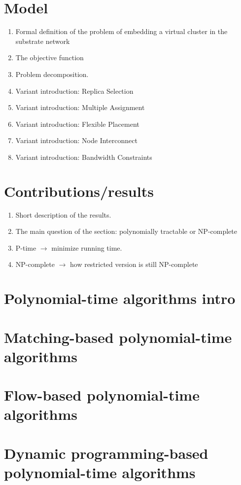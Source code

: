 \documentclass[a4paper]{book}
\begin{document}
\section{Model}
\begin{enumerate}
  \item Formal definition of the problem of embedding a virtual cluster in the substrate network
  \item The objective function
  \item Problem decomposition.
  \item Variant introduction: Replica Selection
  \item Variant introduction: Multiple Assignment
  \item Variant introduction: Flexible Placement
  \item Variant introduction: Node Interconnect
  \item Variant introduction: Bandwidth Constraints
\end{enumerate}
\section{Contributions/results}
\begin{enumerate}
  \item Short description of the results.
  \item The main question of the section: polynomially tractable or NP-complete
  \item P-time $\rightarrow$ minimize running time.
  \item NP-complete $\rightarrow$ how restricted version is still NP-complete
\end{enumerate}

\section{Polynomial-time algorithms intro}
\section{Matching-based polynomial-time algorithms}
\section{Flow-based polynomial-time algorithms}
\section{Dynamic programming-based polynomial-time algorithms}
\end{document}
